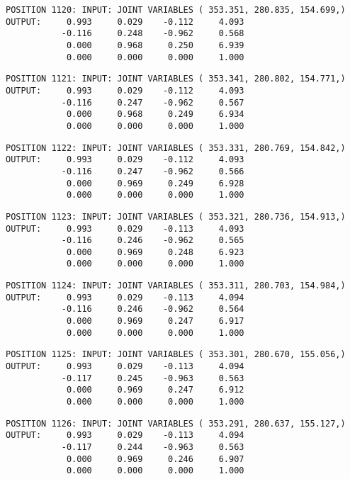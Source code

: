 \begin{verbatim}
POSITION 1120: INPUT: JOINT VARIABLES ( 353.351, 280.835, 154.699,)
OUTPUT:     0.993     0.029    -0.112     4.093
           -0.116     0.248    -0.962     0.568
            0.000     0.968     0.250     6.939
            0.000     0.000     0.000     1.000
\end{verbatim} \pagebreak[1]\begin{verbatim}
POSITION 1121: INPUT: JOINT VARIABLES ( 353.341, 280.802, 154.771,)
OUTPUT:     0.993     0.029    -0.112     4.093
           -0.116     0.247    -0.962     0.567
            0.000     0.968     0.249     6.934
            0.000     0.000     0.000     1.000
\end{verbatim} \pagebreak[1]\begin{verbatim}
POSITION 1122: INPUT: JOINT VARIABLES ( 353.331, 280.769, 154.842,)
OUTPUT:     0.993     0.029    -0.112     4.093
           -0.116     0.247    -0.962     0.566
            0.000     0.969     0.249     6.928
            0.000     0.000     0.000     1.000
\end{verbatim} \pagebreak[1]\begin{verbatim}
POSITION 1123: INPUT: JOINT VARIABLES ( 353.321, 280.736, 154.913,)
OUTPUT:     0.993     0.029    -0.113     4.093
           -0.116     0.246    -0.962     0.565
            0.000     0.969     0.248     6.923
            0.000     0.000     0.000     1.000
\end{verbatim} \pagebreak[1]\begin{verbatim}
POSITION 1124: INPUT: JOINT VARIABLES ( 353.311, 280.703, 154.984,)
OUTPUT:     0.993     0.029    -0.113     4.094
           -0.116     0.246    -0.962     0.564
            0.000     0.969     0.247     6.917
            0.000     0.000     0.000     1.000
\end{verbatim} \pagebreak[1]\begin{verbatim}
POSITION 1125: INPUT: JOINT VARIABLES ( 353.301, 280.670, 155.056,)
OUTPUT:     0.993     0.029    -0.113     4.094
           -0.117     0.245    -0.963     0.563
            0.000     0.969     0.247     6.912
            0.000     0.000     0.000     1.000
\end{verbatim} \pagebreak[1]\begin{verbatim}
POSITION 1126: INPUT: JOINT VARIABLES ( 353.291, 280.637, 155.127,)
OUTPUT:     0.993     0.029    -0.113     4.094
           -0.117     0.244    -0.963     0.563
            0.000     0.969     0.246     6.907
            0.000     0.000     0.000     1.000
\end{verbatim} \pagebreak[1]\begin{verbatim}

\end{verbatim}
